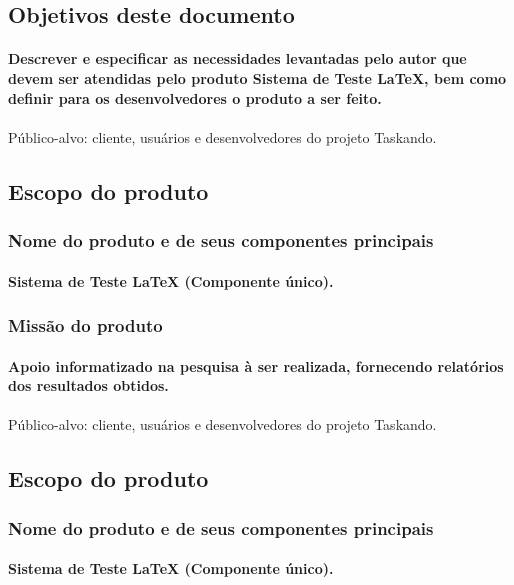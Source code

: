 \documentclass{article}
\begin{document}
	\subsection{Objetivos deste documento}
		\paragraph{Descrever e especificar as necessidades levantadas pelo autor que devem ser atendidas pelo produto Sistema de Teste LaTeX, bem como definir para os desenvolvedores o produto a ser feito.}
\paragraph{}Público-alvo: cliente, usuários e desenvolvedores do projeto Taskando.
	\subsection{Escopo do produto}
		\subsubsection{Nome do produto e de seus componentes principais}
			\paragraph{Sistema de Teste LaTeX (Componente único). }
		\subsubsection{Missão do produto}
			\paragraph{Apoio informatizado na pesquisa à ser realizada, fornecendo relatórios dos resultados obtidos.}
			\paragraph{}Público-alvo: cliente, usuários e desenvolvedores do projeto Taskando.
	\subsection{Escopo do produto}
		\subsubsection{Nome do produto e de seus componentes principais}
			\paragraph{Sistema de Teste LaTeX (Componente único). }
\end{document}
